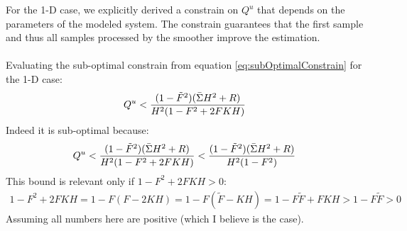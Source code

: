 \documentclass[oneside,12pt]{article}
\begin{document}
%
For the 1-D case, we explicitly derived a constrain on $Q^u$ that depends on the parameters of the modeled system. The constrain guarantees that the first sample and thus all samples processed by the smoother improve the estimation.\\\\
%
Evaluating the sub-optimal constrain from equation \ref{eq:subOptimalConstrain} for the 1-D case:
%
\begin{equation}
        Q^u  < \frac{(1-\tilde{F}^2) (\Bar{\Sigma} H^2  + R) }
        {H^2(1-F^2 + 2FKH  )}
\end{equation}
%
Indeed it is sub-optimal because:
%
%
\begin{equation}
        Q^u  < \frac{(1-\tilde{F}^2) (\Bar{\Sigma} H^2  + R) }
        {H^2(1-F^2 + 2FKH  )} < \frac{(1-\tilde{F}^2) (\Bar{\Sigma} H^2  + R) }
        {H^2(1-F^2)}
\end{equation}
%
This bound is relevant only if $1-F^2 + 2FKH > 0$:
%
\begin{equation}
    \begin{split}
        1-F^2 + 2FKH = 1 - F(F - 2KH) = 1 - F(\tilde{F} - KH) = 1 - F\tilde{F} + FKH >  1 - F\tilde{F} > 0
    \end{split}
\end{equation}
%
Assuming all numbers here are positive (which I believe is the case). 
%
%
\end{document}
